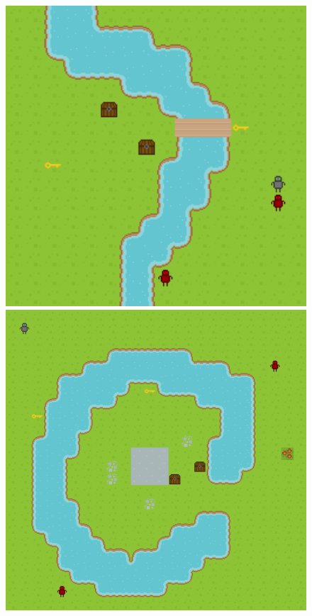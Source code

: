 \documentclass[a4paper 12pts]{article}
\begin{document}
\begin{figure}[h]   
	\includegraphics[width=350pt]{Illustration/screens/screen3.png}
	\includegraphics[width=350pt]{Illustration/screens/screen4.png}
\end{figure}
\end{document}

